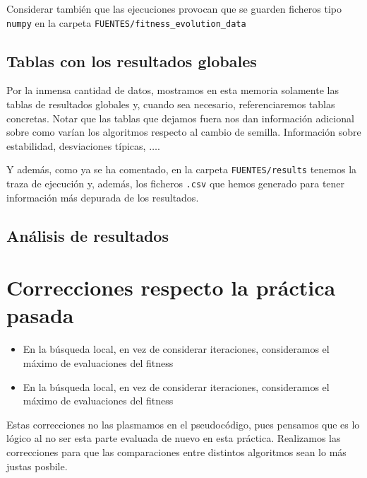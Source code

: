 \documentclass[11pt]{article}
\begin{document}
Considerar también que las ejecuciones provocan que se guarden ficheros tipo \lstinline{numpy} en la carpeta \lstinline{FUENTES/fitness_evolution_data}

\subsection{Tablas con los resultados globales}

Por la inmensa cantidad de datos, mostramos en esta memoria solamente las tablas de resultados globales y, cuando sea necesario, referenciaremos tablas concretas. Notar que las tablas que dejamos fuera nos dan información adicional sobre como varían los algoritmos respecto al cambio de semilla. Información sobre estabilidad, desviaciones típicas, $\ldots$.

Y además, como ya se ha comentado, en la carpeta \lstinline{FUENTES/results} tenemos la traza de ejecución y, además, los ficheros \lstinline{.csv} que hemos generado para tener información más depurada de los resultados.

\subsection{Análisis de resultados}



\pagebreak

\section{Correcciones respecto la práctica pasada}

\begin{itemize}
    \item En la búsqueda local, en vez de considerar iteraciones, consideramos el máximo de evaluaciones del fitness
    \item En la búsqueda local, en vez de considerar iteraciones, consideramos el máximo de evaluaciones del fitness
\end{itemize}

Estas correcciones no las plasmamos en el pseudocódigo, pues pensamos que es lo lógico al no ser esta parte evaluada de nuevo en esta práctica. Realizamos las correcciones para que las comparaciones entre distintos algoritmos sean lo más justas posbile.
\end{document}
